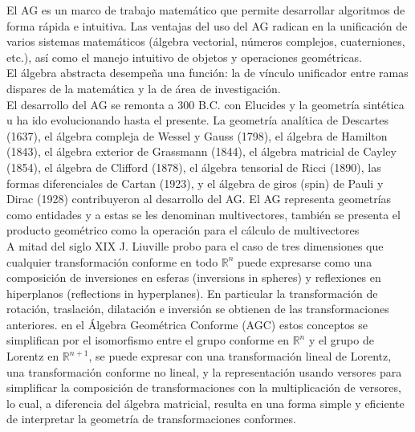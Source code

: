 El AG es un marco de trabajo matemático que permite desarrollar algoritmos de forma rápida e intuitiva. Las ventajas del uso del AG radican en la unificación de varios sistemas matemáticos (álgebra vectorial, números complejos, cuaterniones, etc.), así como el manejo intuitivo de objetos y operaciones geométricas\cite{FoundOfAGC}.\\

El álgebra abstracta desempeña una función: la de vínculo unificador entre ramas dispares de la matemática y la de
área de investigación. \\





El desarrollo del AG se remonta a 300 B.C. con Elucides y la geometría sintética u ha ido evolucionando hasta el presente. La geometría analítica de Descartes (1637), el álgebra compleja de Wessel y Gauss (1798), el álgebra de Hamilton (1843), el álgebra exterior de Grassmann (1844), el álgebra matricial de Cayley (1854), el álgebra de Clifford (1878), el álgebra tensorial de Ricci (1890), las formas diferenciales de Cartan (1923), y el álgebra de giros (spin) de Pauli y Dirac (1928) contribuyeron al desarrollo del AG. El AG representa geometrías como entidades y a estas se les denominan multivectores, también se presenta el producto geométrico como la operación para el cálculo de multivectores\cite{BayroCorrochano2010}\\


A mitad del siglo XIX J. Liuville probo para el caso de tres dimensiones que cualquier transformación conforme en todo $\mathbb{ R}^n$ puede expresarse como una composición de inversiones en esferas (inversions in spheres) y reflexiones en hiperplanos (reflections in hyperplanes). En particular la transformación de rotación, traslación, dilatación e inversión se obtienen de las transformaciones anteriores. en el Álgebra Geométrica Conforme (AGC) estos conceptos se simplifican por el isomorfismo entre el grupo \gls{conforme} en $\mathbb{R}^n$ y el grupo de Lorentz en $\mathbb{R}^{n+1}$, se puede expresar con una transformación lineal de Lorentz, una transformación conforme no lineal, y la representación usando versores para simplificar la composición de transformaciones  con la multiplicación de versores, lo cual, a diferencia del álgebra matricial, resulta en una forma simple y eficiente de interpretar la geometría de transformaciones conformes\cite{BayroCorrochano2010}. \\


